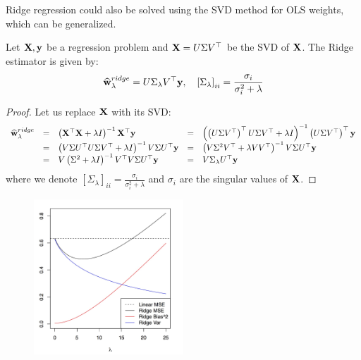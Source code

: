 Ridge regression could also be solved using the SVD method for OLS weights, which can be generalized. 

\begin{claim}
Let $\mathbf{X},\mathbf{y}$ be a regression problem and $\mathbf{X}=U\Sigma V^\top$ be the SVD of $\mathbf{X}$. The Ridge estimator is given by: $$ \widehat{\mathbf{w}}^{ridge}_{\lambda}=U\Sigma_\lambda V^\top\mathbf{y}, \quad \left[\Sigma_\lambda\right]_{ii}=\frac{\sigma_i}{\sigma_i^2+\lambda} $$
\end{claim}
\begin{proof}
Let us replace $\mathbf{X}$ with its SVD:
$$
\begin{array}{cclcl}
\widehat{\mathbf{w}}^{ridge}_{\lambda} & = & \left(\mathbf{X}^{\top}\mathbf{X}+\lambda I\right)^{-1}\mathbf{X}^{\top}\mathbf{y} & = & \left(\left(U\Sigma V^{\top}\right)^{\top}U\Sigma V^{\top}+\lambda I\right)^{-1}\left(U\Sigma V^{\top}\right)^{\top}\mathbf{y}\\
& = & \left(V\Sigma U^{\top}U\Sigma V^{\top}+\lambda I\right)^{-1}V\Sigma U^{\top}\mathbf{y} & = & \left(V\Sigma^{2}V^{\top}+\lambda VV^{\top}\right)^{-1}V\Sigma U^{\top}\mathbf{y}\\
& = & V\left(\Sigma^{2}+\lambda I\right)^{-1}V^{\top}V\Sigma U^{\top}\mathbf{y} & = & V\Sigma_{\lambda}U^{\top}\mathbf{y}
\end{array}
$$
where we denote $\left[\Sigma_\lambda\right]_{ii}=\frac{\sigma_i}{\sigma_i^2 + \lambda}$ and $\sigma_i$ are the singular values of $\mathbf{X}$.
\end{proof}

\begin{figure}[!h]
	\centering
	\includegraphics[width=0.5\textwidth]{chapters/regularization.model.selection/figures/ridge_bias_variance.jpeg}
	\caption{}
\end{figure}

